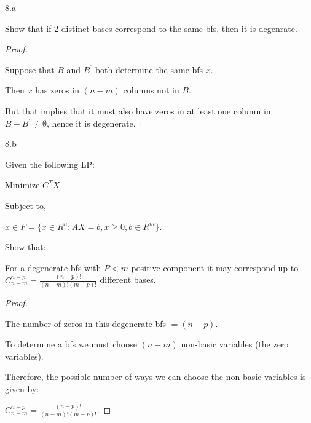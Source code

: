 \documentclass{article}
\begin{document}
\newpage

\begin{customthm}{8.a}
  $ $

  Show that if 2 distinct bases correspond to the same bfs, then it is degenrate.

\end{customthm}

\begin{proof}
  $ $

  Suppose that $B$ and $B^\prime$ both determine the same bfs $x$.
  
  Then $x$ has zeros in $(n-m)$ columns not in $B$.
  
  But that implies that it must also have zeros in at least one column in $B-B^\prime \not = \emptyset$, hence it is degenerate.

\end{proof}
\newpage

\begin{customthm}{8.b}
  $ $

  Given the following LP: 
  
  \qquad Minimize $C^TX$ 
  
  Subject to, 
  
  \qquad $x \in F = \{x \in R^n: AX=b, x\geq 0, b\in R^m \}$.
  \newline

  Show that:

  \qquad For a degenerate bfs with $P<m$ positive component it may correspond up to $C^{n-p}_{n-m}=\frac{(n-p)!}{(n-m)!(m-p)!}$ different bases.

\end{customthm}

\begin{proof}
  $ $

  The number of zeros in this degenerate bfs $= (n-p)$.
  \newline
  
  To determine a bfs we must choose $(n-m)$ non-basic variables (the zero variables).
  \newline

  Therefore, the possible number of ways we can choose the non-basic variables is given by:
  
  \qquad $C^{n-p}_{n-m}=\frac{(n-p)!}{(n-m)!(m-p)!}$.

\end{proof}

\newpage
\end{document}

